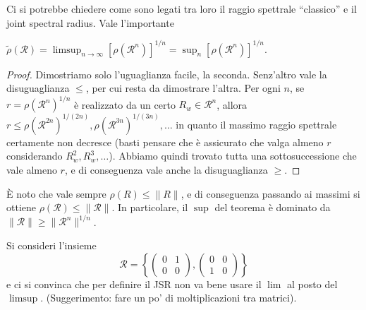 Ci si potrebbe chiedere come sono legati tra loro il raggio spettrale ``classico'' e il joint spectral radius. Vale l'importante 
\begin{teorema}
	$\tilde\rho(\mathcal R) = \limsup_{n\to\infty}[\rho(\mathcal R^{n})]^{1/n} = \sup_{n}[\rho(\mathcal R^{n})]^{1/n}$.
\end{teorema}
\begin{proof}
	Dimostriamo solo l'uguaglianza facile, la seconda. 
	Senz'altro vale la disuguaglianza $\leq$, per cui resta da dimostrare l'altra. Per ogni $n$, se $r = \rho(\mathcal R^{n})^{1/n}$ è realizzato da un certo $R_{w}\in \mathcal R^{n}$, allora $r\leq \rho(\mathcal R^{2n})^{1/(2n)}, \rho(\mathcal R^{3n})^{1/(3n)},\dots$ in quanto il massimo raggio spettrale certamente non decresce (basti pensare che è assicurato che valga almeno $r$ considerando $R_{w}^{2}, R_{w}^{3},\dots$). Abbiamo quindi trovato tutta una sottosuccessione che vale almeno $r$, e di conseguenza vale anche la disuguaglianza $\geq$.
\end{proof}
\begin{osservazione}
	È noto che vale sempre $\rho(R)\leq\|R\|$, e di conseguenza passando ai massimi si ottiene $\rho(\mathcal R) \leq \|\mathcal R\|$. In particolare, il $\sup$ del teorema è dominato da $\|\mathcal R\|\geq\|\mathcal R^{n}\|^{1/n}$.
\end{osservazione}

\begin{esercizio}
	Si consideri l'insieme $$\mathcal R = \left\{\begin{pmatrix}0 & 1 \\ 0 & 0 \end{pmatrix}, \begin{pmatrix}0 & 0 \\ 1 & 0 \end{pmatrix}\right\}$$
	e ci si convinca che per definire il JSR non va bene usare il $\lim$ al posto del $\limsup$. (Suggerimento: fare un po' di moltiplicazioni tra matrici).
\end{esercizio}

